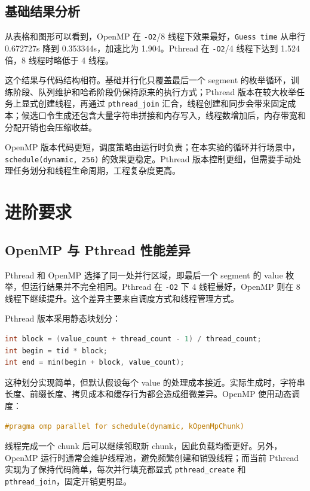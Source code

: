 \documentclass[UTF8,a4paper,12pt]{ctexart}
\begin{document}
\subsection{基础结果分析}

从表格和图形可以看到，OpenMP 在 \texttt{-O2}/8 线程下效果最好，\texttt{Guess time} 从串行 0.672727s 降到 0.353344s，加速比为 1.904。Pthread 在 \texttt{-O2}/4 线程下达到 1.524 倍，8 线程时略低于 4 线程。

这个结果与代码结构相符。基础并行化只覆盖最后一个 segment 的枚举循环，训练阶段、队列维护和哈希阶段仍保持原来的执行方式；Pthread 版本在较大枚举任务上显式创建线程，再通过 \texttt{pthread\_join} 汇合，线程创建和同步会带来固定成本；候选口令生成还包含大量字符串拼接和内存写入，线程数增加后，内存带宽和分配开销也会压缩收益。

OpenMP 版本代码更短，调度策略由运行时负责；在本实验的循环并行场景中，\texttt{schedule(dynamic, 256)} 的效果更稳定。Pthread 版本控制更细，但需要手动处理任务划分和线程生命周期，工程复杂度更高。

\section{进阶要求}

\subsection{OpenMP 与 Pthread 性能差异}

Pthread 和 OpenMP 选择了同一处并行区域，即最后一个 segment 的 value 枚举，但运行结果并不完全相同。Pthread 在 \texttt{-O2} 下 4 线程最好，OpenMP 则在 8 线程下继续提升。这个差异主要来自调度方式和线程管理方式。

Pthread 版本采用静态块划分：

\begin{lstlisting}[language=C++]
int block = (value_count + thread_count - 1) / thread_count;
int begin = tid * block;
int end = min(begin + block, value_count);
\end{lstlisting}

这种划分实现简单，但默认假设每个 value 的处理成本接近。实际生成时，字符串长度、前缀长度、拷贝成本和缓存行为都会造成细微差异。OpenMP 使用动态调度：

\begin{lstlisting}[language=C++]
#pragma omp parallel for schedule(dynamic, kOpenMpChunk)
\end{lstlisting}

线程完成一个 chunk 后可以继续领取新 chunk，因此负载均衡更好。另外，OpenMP 运行时通常会维护线程池，避免频繁创建和销毁线程；而当前 Pthread 实现为了保持代码简单，每次并行填充都显式 \texttt{pthread\_create} 和 \texttt{pthread\_join}，固定开销更明显。
\end{document}
